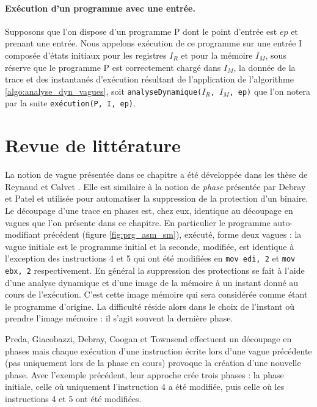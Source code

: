 \paragraph{Exécution d'un programme avec une entrée.}
Supposons que l'on dispose d'un programme P dont le point d'entrée est $ep$ et prenant une entrée.
Nous appelons exécution de ce programme sur une entrée I composée d'états initiaux pour les registres $I_R$ et pour la mémoire $I_M$, sous réserve que le programme P est correctement chargé dans $I_M$, la donnée de la trace et des instantanés d'exécution résultant de l'application de l'algorithme \ref{algo:analyse_dyn_vagues}, soit \texttt{analyseDynamique($I_R$, $I_M$, ep)} que l'on notera par la suite \texttt{exécution(P, I, ep)}.

\section{Revue de littérature}
La notion de vague présentée dans ce chapitre a été développée dans les thèse de Reynaud \cite{Reynaud2010} et Calvet \cite{Calvet2013}.
Elle est similaire à la notion de \emph{phase} présentée par Debray et Patel \cite{DP10} et utilisée pour automatiser la suppression de la protection d'un binaire. Le découpage d'une trace en phases est, chez eux, identique au découpage en vagues que l'on présente dans ce chapitre.
En particulier le programme auto-modifiant précédent (figure \ref{fig:prg_asm_sm}), exécuté, forme deux vagues : la vague initiale est le programme initial et la seconde, modifiée, est identique à l'exception des instructions 4 et 5 qui ont été modifiées en \texttt{mov edi, 2} et \texttt{mov ebx, 2} respectivement.
En général la suppression des protections se fait à l'aide d'une analyse dynamique et d'une image de la mémoire à un instant donné au cours de l'exécution. C'est cette image mémoire qui sera considérée comme étant le programme d'origine. La difficulté réside alors dans le choix de l'instant où prendre l'image mémoire : il s'agit souvent la dernière phase.

Preda, Giacobazzi, Debray, Coogan et Townsend \cite{PGDCT10} effectuent un découpage en phases mais chaque exécution d'une instruction écrite lors d'une vague précédente (pas uniquement lors de la phase en cours) provoque la création d'une nouvelle phase.
Avec l'exemple précédent, leur approche crée trois phases : la phase initiale, celle où uniquement l'instruction 4 a été modifiée, puis celle où les instructions 4 et 5 ont été modifiées.

